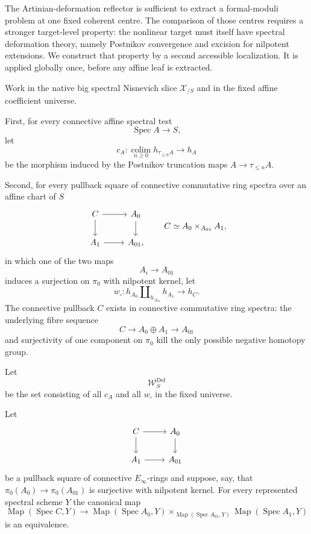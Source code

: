 The Artinian-deformation reflector is sufficient to extract a formal-moduli
problem at one fixed coherent centre.  The comparison of those centres requires
a stronger target-level property: the nonlinear target must itself have
spectral deformation theory, namely Postnikov convergence and excision for
nilpotent extensions.  We construct that property by a second accessible
localization.  It is applied globally once, before any affine leaf is
extracted.

\begin{definition}
\label{def:bnla-global-def-generators}
Work in the native big spectral Nisnevich slice $\mathcal X_{/S}$ and in the
fixed affine coefficient universe.

First, for every connective affine spectral test
\[
    \operatorname{Spec}A\longrightarrow S,
\]
let
\[
\boxed{
    c_A:
    \operatorname*{colim}_{n\geq0}h_{\tau_{\leq n}A}
    \longrightarrow
    h_A}
\]
be the morphism induced by the Postnikov truncation maps
$A\to\tau_{\leq n}A$.

Second, for every pullback square of connective commutative ring spectra over
an affine chart of $S$
\[
\begin{tikzcd}
C \arrow[r] \arrow[d] &
A_0 \arrow[d]\\
A_1 \arrow[r] &
A_{01},
\end{tikzcd}
\qquad
C\simeq A_0\times_{A_{01}}A_1,
\]
in which one of the two maps
\[
    A_i\longrightarrow A_{01}
\]
induces a surjection on $\pi_0$ with nilpotent kernel, let
\[
\boxed{
    w_{\square}:
    h_{A_0}\amalg_{h_{A_{01}}}h_{A_1}
    \longrightarrow
    h_C.}
\]
The connective pullback $C$ exists in connective commutative ring spectra:
the underlying fibre sequence
\[
    C\longrightarrow A_0\oplus A_1\longrightarrow A_{01}
\]
and surjectivity of one component on $\pi_0$ kill the only possible negative
homotopy group.

Let
\[
    \mathcal W^{\mathrm{Def}}_S
\]
be the set consisting of all $c_A$ and all $w_{\square}$ in the fixed
universe.
\end{definition}

\begin{lemma}
\label{lem:bnla-spectral-nilpotent-gluing}
Let
\[
\begin{tikzcd}
C \arrow[r] \arrow[d] &
A_0 \arrow[d]\\
A_1 \arrow[r] &
A_{01}
\end{tikzcd}
\]
be a pullback square of connective $E_\infty$-rings and suppose, say, that
$\pi_0(A_0)\to\pi_0(A_{01})$ is surjective with nilpotent kernel.  For every
represented spectral scheme $Y$ the canonical map
\[
\boxed{
    \operatorname{Map}(\operatorname{Spec}C,Y)
    \longrightarrow
    \operatorname{Map}(\operatorname{Spec}A_0,Y)
    \times_{\operatorname{Map}(\operatorname{Spec}A_{01},Y)}
    \operatorname{Map}(\operatorname{Spec}A_1,Y)}
\]
is an equivalence.
\end{lemma}

